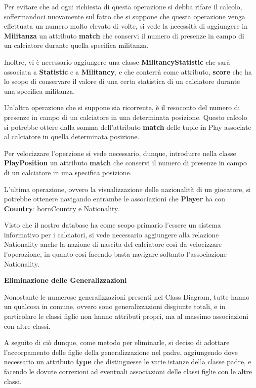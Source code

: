Per evitare che ad ogni richiesta di questa operazione si 
debba rifare il calcolo, soffermandoci nuovamente sul fatto 
che si suppone che questa operazione venga effettuata un 
numero molto elevato di volte, si vede la necessità di 
aggiungere in \textbf{Militanza} un attributo \textbf{match} 
che conservi il numero di presenze in campo di un calciatore 
durante quella specifica militanza.

Inoltre, vi è necessario aggiungere una classe 
\textbf{MilitancyStatistic} che sarà associata a 
\textbf{Statistic} e a \textbf{Militancy}, e che conterrà 
come attributo, \textbf{score} che ha lo scopo di conservare 
il valore di una certa statistica di un calciatore durante 
una specifica militanza.


Un'altra operazione che si suppone sia ricorrente, è il 
resoconto
del numero di presenze in campo di un calciatore in una 
determinata posizione.
Questo calcolo si potrebbe ottere dalla somma dell'attributo 
\textbf{match} delle tuple in Play associate al calciatore in 
quella determinata posizione.

Per velocizzare l'operzione si vede necessario, dunque, 
introdurre nella classe \textbf{PlayPosition} un attributo 
\textbf{match} che conservi il numero di presenze in campo di 
un calciatore in una specifica posizione.


L'ultima operazione, ovvero la visualizzazione delle 
nazionalità di un giocatore, si potrebbe ottenere navigando 
entrambe le associazioni che \textbf{Player} ha con 
\textbf{Country}: bornCountry e Nationality.

Visto che il nostro database ha come scopo primario l'essere 
un sistema informativo per i calciatori, si vede necessario 
aggiungere alla relazione Nationality anche la nazione di 
nascita del calciatore così da velocizzare l'operazione, in 
quanto così facendo basta navigare soltanto l'associazione 
Nationality.

\newpage
\textbf{\large Eliminazione delle Generalizzazioni}

Nonostante le numerose generalizzazioni presenti nel Class 
Diagram, tutte hanno un qualcosa in comune, ovvero sono 
generalizzazioni disgiunte totali, e in particolare le classi 
figlie non hanno attributi propri, ma al massimo associazioni 
con altre classi.

A seguito di ciò dunque, come metodo per eliminarle, si 
deciso di adottare l'accorpamento delle figlie della 
generalizzazione nel padre, aggiungendo dove necessario un 
attributo \textbf{type} che distinguesse le varie istanze 
della classe padre, e facendo le dovute correzioni ad 
eventuali associazioni delle classi figlie con le altre 
classi.

